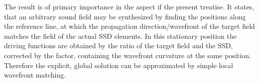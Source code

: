 \documentclass[12pt,a4paper]{article}
\begin{document}
The result is of primary importance in the aspect if the present treatise.
It states, that an arbitrary sound field may be synthesized by finding the positions along the reference line, at which the propagation direction/wavefront of the target field matches the field of the actual SSD elements.
In this stationary position the driving functions are obtained by the ratio of the target field and the SSD, corrected by the factor, containing the wavefront curvature at the same position.
Therefore the explicit, global solution can be approximated by simple local wavefront matching.
\end{document}
